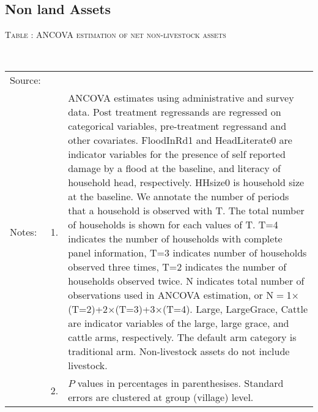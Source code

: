 \subsection{Non land Assets}


\hspace{-1cm}\begin{minipage}[t]{14cm}
\hfil\textsc{\normalsize Table \thetable: ANCOVA estimation of net non-livestock assets\label{tab ANCOVA NetNLAssets}}\\
\setlength{\tabcolsep}{1pt}
\setlength{\baselineskip}{8pt}
\renewcommand{\arraystretch}{.55}
\hfil{}\\
\renewcommand{\arraystretch}{.8}
\setlength{\tabcolsep}{1pt}
\begin{tabular}{>{\hfill\scriptsize}p{1cm}<{}>{\hfill\scriptsize}p{.25cm}<{}>{\scriptsize}p{12cm}<{\hfill}}
Source:& \multicolumn{2}{l}{\scriptsize Estimated with GUK administrative and survey data.}\\
Notes: & 1. & ANCOVA estimates using administrative and survey data. Post treatment regressands are regressed on categorical variables, pre-treatment regressand and other covariates. \textsf{FloodInRd1} and \textsf{HeadLiterate0} are indicator variables for the presence of self reported damage by a flood at the baseline, and literacy of household head, respectively. \textsf{HHsize0} is household size at the baseline. We annotate the number of periods that a household is observed with \textsf{T}. The total number of households is shown for each values of \textsf{T}. \textsf{T=4} indicates the number of households with complete panel information, \textsf{T=3} indicates number of households observed three times, \textsf{T=2} indicates the number of households observed twice. \textsf{N} indicates total number of observations used in ANCOVA estimation, or \textsf{N$=$1$\times$(T=2)+2$\times$(T=3)+3$\times$(T=4)}.  \textsf{Large}, \textsf{LargeGrace}, \textsf{Cattle} are indicator variables of the \textsf{large}, \textsf{large grace}, and \textsf{cattle} arms, respectively. The default arm category is \textsf{traditional} arm. Non-livestock assets do not include livestock. \\
& 2. & $P$ values in percentages in parenthesises. Standard errors are clustered at group (village) level.
\end{tabular}
\end{minipage}

